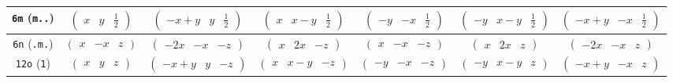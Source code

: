 \documentclass[fleqn,9pt,landscape]{jsarticle}
\begin{document}
\begin{center}
\begin{longtable}{ccccccc}
{\tt 6m} ({\tt m..}) & $ \begin{pmatrix} x & y & \frac{1}{2} \end{pmatrix} $ & $ \begin{pmatrix} - x + y & y & \frac{1}{2} \end{pmatrix} $ & $ \begin{pmatrix} x & x - y & \frac{1}{2} \end{pmatrix} $ & $ \begin{pmatrix} - y & - x & \frac{1}{2} \end{pmatrix} $ & $ \begin{pmatrix} - y & x - y & \frac{1}{2} \end{pmatrix} $ & $ \begin{pmatrix} - x + y & - x & \frac{1}{2} \end{pmatrix} $ \\ \hline
{\tt 6n} ({\tt .m.}) & $ \begin{pmatrix} x & - x & z \end{pmatrix} $ & $ \begin{pmatrix} - 2 x & - x & - z \end{pmatrix} $ & $ \begin{pmatrix} x & 2 x & - z \end{pmatrix} $ & $ \begin{pmatrix} x & - x & - z \end{pmatrix} $ & $ \begin{pmatrix} x & 2 x & z \end{pmatrix} $ & $ \begin{pmatrix} - 2 x & - x & z \end{pmatrix} $ \\ \hline
{\tt 12o} ({\tt 1}) & $ \begin{pmatrix} x & y & z \end{pmatrix} $ & $ \begin{pmatrix} - x + y & y & - z \end{pmatrix} $ & $ \begin{pmatrix} x & x - y & - z \end{pmatrix} $ & $ \begin{pmatrix} - y & - x & - z \end{pmatrix} $ & $ \begin{pmatrix} - y & x - y & z \end{pmatrix} $ & $ \begin{pmatrix} - x + y & - x & z \end{pmatrix} $ \\

\end{longtable}
\end{center}
\end{document}
